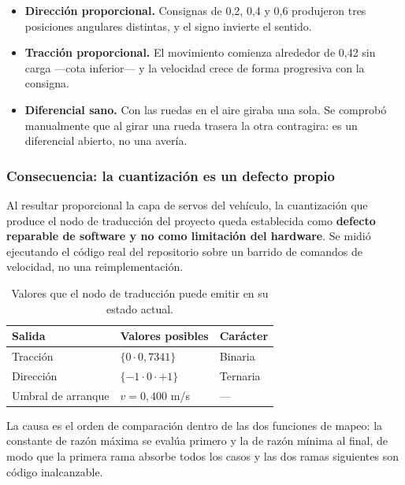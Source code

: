 \documentclass[12pt,letterpaper]{article}
\begin{document}
\begin{itemize}
    \item \textbf{Dirección proporcional.} Consignas de 0,2, 0,4 y 0,6 produjeron tres posiciones angulares distintas, y el signo invierte el sentido.
    \item \textbf{Tracción proporcional.} El movimiento comienza alrededor de 0,42 sin carga ---cota inferior--- y la velocidad crece de forma progresiva con la consigna.
    \item \textbf{Diferencial sano.} Con las ruedas en el aire giraba una sola. Se comprobó manualmente que al girar una rueda trasera la otra contragira: es un diferencial abierto, no una avería.
\end{itemize}

\subsubsection{Consecuencia: la cuantización es un defecto propio}

Al resultar proporcional la capa de servos del vehículo, la cuantización que produce el nodo de traducción del proyecto queda establecida como \textbf{defecto reparable de software y no como limitación del hardware}. Se midió ejecutando el código real del repositorio sobre un barrido de comandos de velocidad, no una reimplementación.

\begin{table}[H]
    \centering
    \small
    \caption{Valores que el nodo de traducción puede emitir en su estado actual.}
    \label{tab:cuantizacion}
    \begin{tabular}{@{}lll@{}}
        \toprule
        \textbf{Salida} & \textbf{Valores posibles} & \textbf{Carácter} \\ \midrule
        Tracción  & $\{0 \cdot 0{,}7341\}$          & Binaria  \\
        Dirección & $\{-1 \cdot 0 \cdot +1\}$       & Ternaria \\
        Umbral de arranque & $v = 0{,}400$ m/s      & --- \\ \bottomrule
    \end{tabular}
\end{table}

La causa es el orden de comparación dentro de las dos funciones de mapeo: la constante de razón máxima se evalúa primero y la de razón mínima al final, de modo que la primera rama absorbe todos los casos y las dos ramas siguientes son código inalcanzable.
\end{document}
